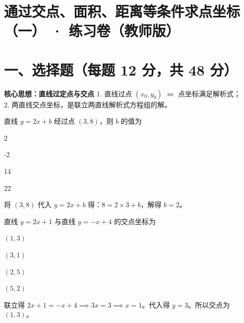 \documentclass{exam-zh}
\begin{document}
\section*{通过交点、面积、距离等条件求点坐标（一） · 练习卷（教师版）}

\section*{一、选择题（每题 12 分，共 48 分）}


\begin{keyideabox}
  \textbf{核心思想：直线过定点与交点}
  1. 直线过点 $(x_0, y_0)$ $\Leftrightarrow$ 点坐标满足解析式；\\ 2. 两直线交点坐标，是联立两直线解析式方程组的解。
\end{keyideabox}



\begin{question}[points=12]
  直线 $y = 2x + b$ 经过点 $(3, 8)$，则 $b$ 的值为
  \begin{choices}
    \item 2
    \item -2
    \item 14
    \item 22
  \end{choices}
  \paren[A]
  \begin{solutionblock}
    将 $(3, 8)$ 代入 $y = 2x + b$ 得：$8 = 2 \times 3 + b$，解得 $b = 2$。
  \end{solutionblock}
\end{question}



\begin{question}[points=12]
  直线 $y = 2x + 1$ 与直线 $y = -x + 4$ 的交点坐标为
  \begin{choices}
    \item $(1, 3)$
    \item $(3, 1)$
    \item $(2, 5)$
    \item $(5, 2)$
  \end{choices}
  \paren[A]
  \begin{solutionblock}
    联立得 $2x + 1 = -x + 4 \implies 3x = 3 \implies x = 1$。代入得 $y = 3$。所以交点为 $(1, 3)$。
  \end{solutionblock}
\end{question}
\end{document}
